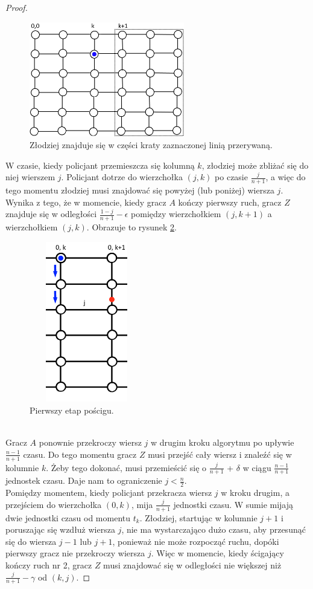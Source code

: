\documentclass{xmgr}
\theoremstyle{definition}
\begin{document}
\begin{proof}
	\begin{figure}[ht!]
	  \centering
	  \includegraphics[height=5cm]{rysunki/podsiatka.png}
	  \caption{Złodziej znajduje się w części kraty zaznaczonej linią przerywaną.}
    \label{fig:miejsceucieczki}
	\end{figure} 

	\indent W czasie, kiedy policjant przemieszcza się kolumną $k$, złodziej może zbliżać się do niej wierszem $j$. Policjant dotrze do wierzchołka $(j,k)$ po czasie $\frac{j}{n+1}$, a więc do tego momentu złodziej musi znajdować się powyżej (lub poniżej) wiersza $j$. Wynika z tego, że w momencie, kiedy gracz $A$ kończy pierwszy ruch, gracz $Z$ znajduje się w odległości $\frac{1-j}{n+1}-\epsilon$ pomiędzy wierzchołkiem $(j,k + 1)$ a wierzchołkiem $(j,k)$. Obrazuje to rysunek \ref{fig:pierwszy krok}.
	\begin{figure}[ht!]
	  \centering
	  \includegraphics[width=5cm,height=7cm]{rysunki/poscig_1.png}
	  \caption{Pierwszy etap pościgu.}
	  \label{fig:pierwszy krok}
	\end{figure}
	\\\indent Gracz $A$ ponownie przekroczy wiersz $j$ w drugim kroku algorytmu po upływie $\frac{n-1}{n+1}$ czasu. Do tego momentu gracz $Z$ musi przejść cały wiersz i znaleźć się w kolumnie $k$. Żeby tego dokonać, musi przemieścić się o $\frac{j}{n+1}$ + $\delta$ w ciągu $\frac{n-1}{n+1}$ jednostek czasu. Daje nam to ograniczenie $j < \frac{n}{2}$.
	\\\indent Pomiędzy momentem, kiedy policjant przekracza wiersz $j$ w kroku drugim, a przejściem do wierzchołka $(0,k)$, mija $\frac{j}{n+1}$ jednostki czasu. W sumie mijają dwie jednostki czasu od momentu $t_k$. Złodziej, startując w kolumnie $j + 1$ i poruszając się wzdłuż wiersza $j$, nie ma wystarczająco dużo czasu, aby przesunąć się do wiersza $j-1$ lub $j + 1$, ponieważ nie może rozpocząć ruchu, dopóki pierwszy gracz nie przekroczy wiersza $j$. Więc w momencie, kiedy ścigający kończy ruch nr 2, gracz $Z$ musi znajdować się w odległości nie większej niż $\frac{j}{n+1}-\gamma$ od $(k,j)$. 


\end{proof}
\end{document}
